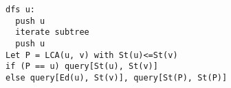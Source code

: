 \begin{lstlisting}
dfs u:
  push u
  iterate subtree
  push u
Let P = LCA(u, v) with St(u)<=St(v)
if (P == u) query[St(u), St(v)]
else query[Ed(u), St(v)], query[St(P), St(P)]
\end{lstlisting}
